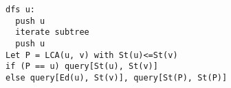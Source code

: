 \begin{lstlisting}
dfs u:
  push u
  iterate subtree
  push u
Let P = LCA(u, v) with St(u)<=St(v)
if (P == u) query[St(u), St(v)]
else query[Ed(u), St(v)], query[St(P), St(P)]
\end{lstlisting}
